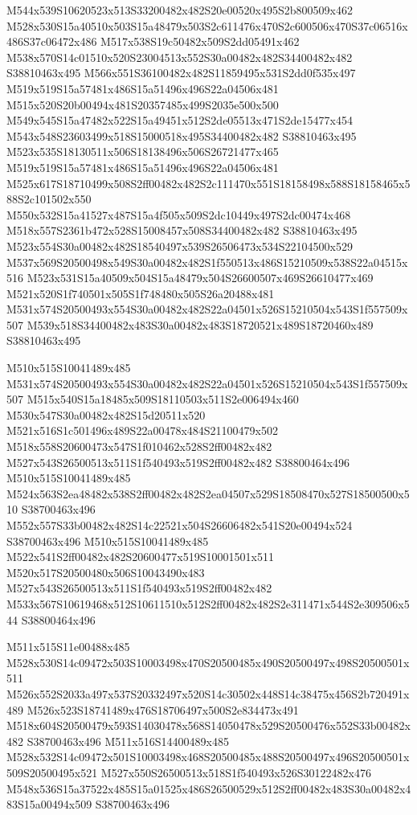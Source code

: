 \documentclass{article}
\begin{document}
\begin{multicols}{2}
M544x539S10620523x513S33200482x482S20e00520x495S2b800509x462 M528x530S15a40510x503S15a48479x503S2c611476x470S2c600506x470S37c06516x486S37c06472x486 M517x538S19c50482x509S2dd05491x462 M538x570S14c01510x520S23004513x552S30a00482x482S34400482x482 S38810463x495 M566x551S36100482x482S11859495x531S2dd0f535x497 M519x519S15a57481x486S15a51496x496S22a04506x481 M515x520S20b00494x481S20357485x499S2035e500x500 M549x545S15a47482x522S15a49451x512S2de05513x471S2de15477x454 M543x548S23603499x518S15000518x495S34400482x482 S38810463x495 M523x535S18130511x506S18138496x506S26721477x465 M519x519S15a57481x486S15a51496x496S22a04506x481 M525x617S18710499x508S2ff00482x482S2c111470x551S18158498x588S18158465x588S2c101502x550 M550x532S15a41527x487S15a4f505x509S2dc10449x497S2dc00474x468 M518x557S2361b472x528S15008457x508S34400482x482 S38810463x495 M523x554S30a00482x482S18540497x539S26506473x534S22104500x529 M537x569S20500498x549S30a00482x482S1f550513x486S15210509x538S22a04515x516 M523x531S15a40509x504S15a48479x504S26600507x469S26610477x469 M521x520S1f740501x505S1f748480x505S26a20488x481 M531x574S20500493x554S30a00482x482S22a04501x526S15210504x543S1f557509x507 M539x518S34400482x483S30a00482x483S18720521x489S18720460x489 S38810463x495

M510x515S10041489x485 M531x574S20500493x554S30a00482x482S22a04501x526S15210504x543S1f557509x507 M515x540S15a18485x509S18110503x511S2e006494x460 M530x547S30a00482x482S15d20511x520 M521x516S1c501496x489S22a00478x484S21100479x502 M518x558S20600473x547S1f010462x528S2ff00482x482 M527x543S26500513x511S1f540493x519S2ff00482x482 S38800464x496 M510x515S10041489x485 M524x563S2ea48482x538S2ff00482x482S2ea04507x529S18508470x527S18500500x510 S38700463x496 M552x557S33b00482x482S14c22521x504S26606482x541S20e00494x524 S38700463x496 M510x515S10041489x485 M522x541S2ff00482x482S20600477x519S10001501x511 M520x517S20500480x506S10043490x483 M527x543S26500513x511S1f540493x519S2ff00482x482 M533x567S10619468x512S10611510x512S2ff00482x482S2e311471x544S2e309506x544 S38800464x496

M511x515S11e00488x485 M528x530S14c09472x503S10003498x470S20500485x490S20500497x498S20500501x511 M526x552S2033a497x537S20332497x520S14c30502x448S14c38475x456S2b720491x489 M526x523S18741489x476S18706497x500S2e834473x491 M518x604S20500479x593S14030478x568S14050478x529S20500476x552S33b00482x482 S38700463x496 M511x516S14400489x485 M528x532S14c09472x501S10003498x468S20500485x488S20500497x496S20500501x509S20500495x521 M527x550S26500513x518S1f540493x526S30122482x476 M548x536S15a37522x485S15a01525x486S26500529x512S2ff00482x483S30a00482x483S15a00494x509 S38700463x496


\end{multicols}
\end{document}
